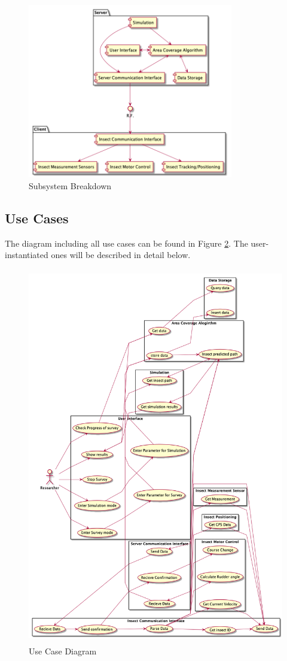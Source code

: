 \documentclass[11pt]{article}
\begin{document}
\begin{figure}[H]
   \centering
   \includegraphics[width=0.8\textwidth]{diagram/component-diagram.png}
   \caption{Subsystem Breakdown}
   \label{fig:sub}
\end{figure}
\subsection{Use Cases}
The diagram including all use cases can be found in Figure \ref{fig:usecase}. The user-instantiated ones will be described in detail below.
\begin{figure}[H]
   \centering
   \includegraphics[width=\textwidth, height=16.5cm]{diagram/usecase.png} %
   \caption{Use Case Diagram}
   \label{fig:usecase}
\end{figure}
\end{document}
